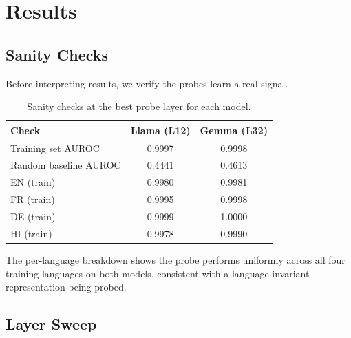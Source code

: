 \documentclass{article}
\newcommand{\auroc}{AUROC\xspace}
\begin{document}
\section{Results}
\label{sec:results}

\subsection{Sanity Checks}

Before interpreting results, we verify the probes learn a real signal.

\begin{table}[h]
\centering
\caption{Sanity checks at the best probe layer for each model.}
\label{tab:sanity}
\begin{tabular}{lcc}
\toprule
Check                     & Llama (L12) & Gemma (L32) \\
\midrule
Training set \auroc        & 0.9997      & 0.9998      \\
Random baseline \auroc     & 0.4441      & 0.4613      \\
EN (train)                 & 0.9980      & 0.9981      \\
FR (train)                 & 0.9995      & 0.9998      \\
DE (train)                 & 0.9999      & 1.0000      \\
HI (train)                 & 0.9978      & 0.9990      \\
\bottomrule
\end{tabular}
\end{table}

The per-language breakdown shows the probe performs uniformly across all four
training languages on both models, consistent with a language-invariant
representation being probed.

\subsection{Layer Sweep}
\label{sec:layer_sweep}
\end{document}
